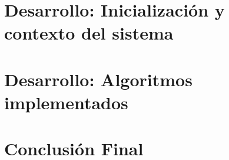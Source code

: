 \documentclass[a4paper,10pt,twoside]{article}
\begin{document}

\tableofcontents

\newpage

    
    \newpage

    \section{Desarrollo: Inicialización y contexto del sistema}
            
        \newpage
            
        \newpage
            
        \newpage
            
        \newpage
           
        \newpage
    \section{Desarrollo: Algoritmos implementados}
        
        \newpage
        
        \newpage
        
        \newpage
    \section{Conclusión Final}
        
\end{document}
